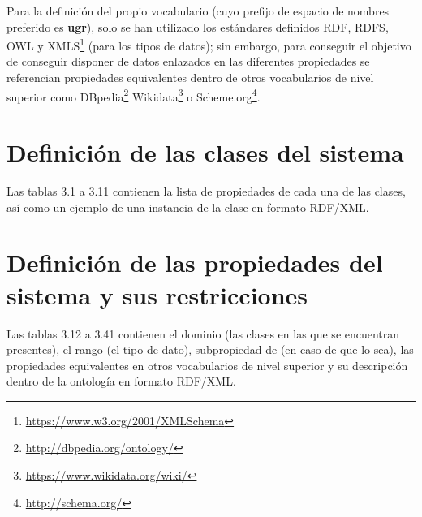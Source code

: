 Para la definición del propio vocabulario (cuyo prefijo de espacio de nombres preferido es \textbf{ugr}), solo se han utilizado los estándares definidos {\sf RDF}, {\sf RDFS}, {\sf OWL} y {\sf XMLS}\footnote{\url{https://www.w3.org/2001/XMLSchema}} (para los tipos de datos); sin embargo, para conseguir el objetivo de conseguir disponer de datos enlazados en las diferentes propiedades se referencian propiedades equivalentes dentro de otros vocabularios de nivel superior como {\sf DBpedia}\footnote{\url{http://dbpedia.org/ontology/}} {\sf Wikidata}\footnote{\url{https://www.wikidata.org/wiki/}} o {\sf Scheme.org}\footnote{\url{http://schema.org/}}.

\section{Definición de las clases del sistema}

Las tablas 3.1 a 3.11 contienen la lista de propiedades de cada una de las clases, así como un ejemplo de una instancia de la clase en formato {\sf RDF/XML}. 

\section{Definición de las propiedades del sistema y sus restricciones}

Las tablas 3.12 a 3.41 contienen el dominio (las clases en las que se encuentran presentes), el rango (el tipo de dato), subpropiedad de (en caso de que lo sea), las propiedades equivalentes en otros vocabularios de nivel superior y su descripción dentro de la ontología en formato {\sf RDF/XML}.
\bigskip

